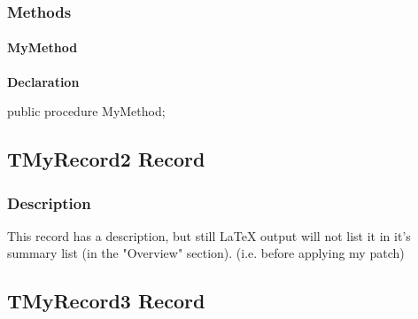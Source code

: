 \documentclass{report}
\newif\ifpdf
\begin{document}
\subsubsection*{\large{\textbf{Methods}}\normalsize\hspace{1ex}\hfill}
\paragraph*{MyMethod}\hspace*{\fill}

\label{ok_nodescription_printing.TClass1-MyMethod}
\begin{list}{}{
\setlength{\itemindent}{0cm}
\setlength{\listparindent}{0cm}
\setlength{\leftmargin}{\evensidemargin}
\addtolength{\leftmargin}{\tmplength}
\settowidth{\labelsep}{X}
\addtolength{\leftmargin}{\labelsep}
\setlength{\labelwidth}{\tmplength}
}
\item[\textbf{Declaration}\hfill]
\ifpdf
\begin{flushleft}
\fi
\begin{ttfamily}
public procedure MyMethod;\end{ttfamily}

\ifpdf
\end{flushleft}
\fi

\end{list}
\ifpdf
\subsection*{\large{\textbf{TMyRecord2 Record}}\normalsize\hspace{1ex}\hrulefill}
\else
\subsection*{TMyRecord2 Record}
\fi
\label{ok_nodescription_printing.TMyRecord2}
\subsubsection*{\large{\textbf{Description}}\normalsize\hspace{1ex}\hfill}
This record has a description, but still LaTeX output will not list it in it's summary list (in the "Overview" section). (i.e. before applying my patch)\ifpdf
\subsection*{\large{\textbf{TMyRecord3 Record}}\normalsize\hspace{1ex}\hrulefill}
\else
\end{document}
